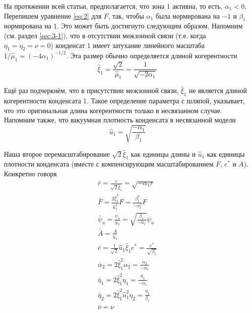 На протяжении всей статьи, предполагается, что зона 1 активна, то есть, 
\( \alpha_1 < 0 \). Перепишем уравнение \eqref{eq:2} для \( F \), так, чтобы 
\( \alpha_1 \) была нормирована на \( -1 \) и \( \beta_1 \) нормирована на 
\( 1 \). Это может быть достигнуто следующим образом. Напомним (см. раздел 
\ref{sec:3-1}), что в отсутствии межзонной связи (т.е. когда 
\( \eta_1 = \eta_2 = \nu = 0 \)) конденсат 1 имеет затухание линейного 
масштаба \( 1/\hat{\mu}_1 = (-4\alpha_1)^{-1/2} \). Эта размер обычно
определяется длиной когерентности
\begin{equation}
  \hat{\xi}_1 = \frac{\sqrt{2}}{\hat{\mu}_1} = \frac{1}{\sqrt{-2\alpha_1}}
  \label{eq:A-4}
\end{equation}

Ещё раз подчеркнём, что в присутствии межзонной связи, \( \hat{\xi}_1 \) не
является длиной когерентности конденсата 1. Такое определение параметра с 
шляпой, указывает, что это оригинальная длина когерентности только в 
несвязанном случае. Напомним также, что вакуумная плотность конденсата в 
несвязанной модели
\begin{equation}
  \hat{u}_1 = \sqrt{\frac{-\alpha_1}{\beta_1}}
  \label{eq:A-5}
\end{equation}

Наша второе перемасштабирование \( \sqrt{2}\hat{\xi}_1 \) как единицы длины
и \( \hat{u}_1 \) как единицы плотности конденсата (вместе с компенсирующим
масштабированием \( F \), \( e^* \) и \( A \)). Конкретно говоря
\begin{gather}
  \bar{r} = \frac{r}{\sqrt{2}\hat{\xi}_1} = \sqrt{-\alpha_1 r} \nonumber \\
  \bar{F} = \frac{2\hat{\xi}^2_1}{\hat{u}^4_1}F =
    \frac{\beta^2_1}{-\alpha^3_1}F \nonumber \\
  \bar{\psi}_a = \frac{\psi_a}{\hat{u}_1} =
    \sqrt{\frac{\beta_1}{-\alpha_1}}\psi_a \nonumber \\
  \bar{A} = \frac{A}{\hat{u}_1} \\
  \bar{e} = \frac{1}{\sqrt{2}}\hat{u}_1\hat{\xi}_1 e^* =
    \frac{e^*}{\sqrt{\beta_1}} \nonumber \\
  \bar{\alpha}_2 = 2\hat{\xi}^2_1 \alpha_2 = \frac{\alpha_2}{-\alpha_1}
    \nonumber \\
  \bar{\eta}_1 = 2\hat{\xi}^2_1 \eta_1 = \frac{\eta_1}{-\alpha_1} \nonumber \\
  \bar{\eta}_2 = 2\hat{\xi}^2_1 \hat{u}^2_1 \eta_2 =
    \frac{\eta_2}{\beta_1} \nonumber \\
  \bar{\nu} = \nu \label{eq:A-6}
\end{gather}

